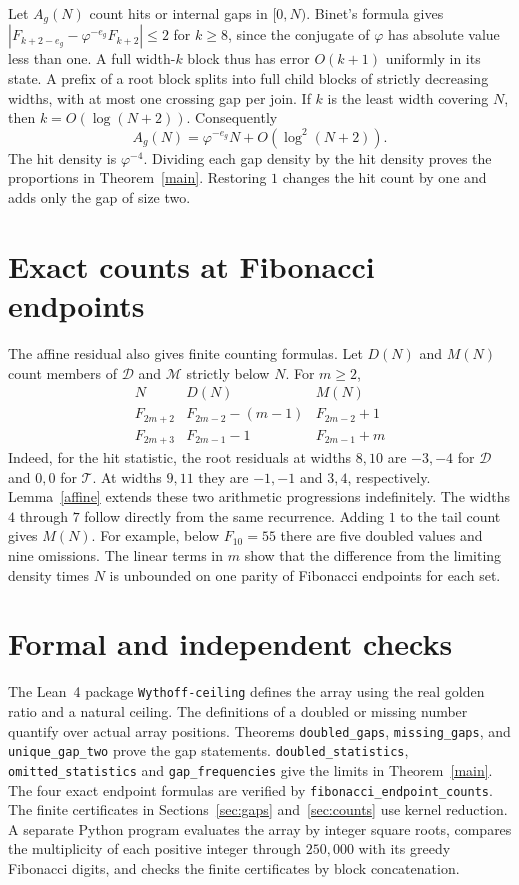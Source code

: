 \documentclass[11pt]{article}
\newcommand{\D}{\mathcal D}
\newcommand{\M}{\mathcal M}
\newcommand{\T}{\mathcal T}
\newcommand{\ph}{\varphi}
\begin{document}
Let $A_g(N)$ count hits or internal gaps in $[0,N)$.
Binet's formula gives $|F_{k+2-e_g}-\ph^{-e_g}F_{k+2}|\le2$ for $k\ge8$,
since the conjugate of $\ph$ has absolute value less than one. A full
width-$k$ block thus has error $O(k+1)$ uniformly in its state. A prefix
of a root block splits into full child blocks of strictly decreasing
widths, with at most one crossing gap per join. If $k$ is the least width
covering $N$, then $k=O(\log(N+2))$. Consequently
\[
                    A_g(N)=\ph^{-e_g}N+O\!\left(\log^2(N+2)\right).
\]
The hit density is $\ph^{-4}$. Dividing each gap density by the hit
density proves the proportions in Theorem~\ref{main}. Restoring $1$
changes the hit count by one and adds only the gap of size two.

\newpage
\section{Exact counts at Fibonacci endpoints}
The affine residual also gives finite counting formulas. Let $D(N)$ and
$M(N)$ count members of $\D$ and $\M$ strictly below $N$. For $m\ge2$,
\[
\begin{array}{c|cc}
 N&D(N)&M(N)\\ \hline
 F_{2m+2}&F_{2m-2}-(m-1)&F_{2m-2}+1\\
 F_{2m+3}&F_{2m-1}-1&F_{2m-1}+m
\end{array}
\]
Indeed, for the hit statistic, the root residuals at widths $8,10$ are
$-3,-4$ for $\D$ and $0,0$ for $\T$. At widths $9,11$ they are $-1,-1$
and $3,4$, respectively. Lemma~\ref{affine} extends these two arithmetic
progressions indefinitely. The widths $4$ through $7$ follow directly
from the same recurrence. Adding $1$ to the tail count gives $M(N)$.
For example, below $F_{10}=55$ there are five doubled values and nine
omissions. The linear terms in $m$ show that the difference from the
limiting density times $N$ is unbounded on one parity of Fibonacci
endpoints for each set.

\section*{Formal and independent checks}
The Lean~4 package \texttt{Wythoff-ceiling} defines the array using the
real golden ratio and a natural ceiling. The definitions of a doubled or
missing number quantify over actual array positions. Theorems
\texttt{doubled\_gaps}, \texttt{missing\_gaps}, and
\texttt{unique\_gap\_two} prove the gap statements.
\texttt{doubled\_statistics}, \texttt{omitted\_statistics} and
\texttt{gap\_frequencies} give the limits in Theorem~\ref{main}. The four exact endpoint formulas are verified by \texttt{fibonacci\_endpoint\_counts}.
The finite certificates in Sections~\ref{sec:gaps} and~\ref{sec:counts}
use kernel reduction. A separate Python program evaluates the array by
integer square roots, compares the multiplicity of each positive integer
through $250{,}000$ with its greedy Fibonacci digits, and checks the finite
certificates by block concatenation.
\end{document}
